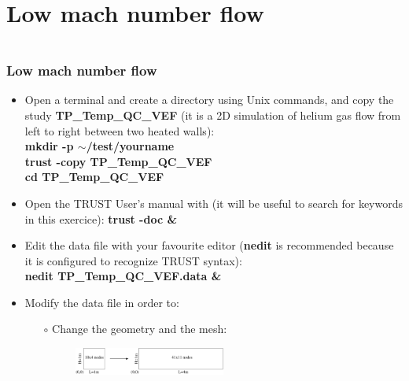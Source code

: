\documentclass[10pt]{beamer}
\begin{document}
\section{Low mach number flow}
\begin{frame}
\begin{columns}[c] 
\tableofcontents[sections={1-7},currentsection, currentsubsection]
\tableofcontents[sections={8-13},currentsection, currentsubsection]
\end{columns}
\end{frame}
\begin{frame}
\frametitle{Low mach number flow}
\begin{block}{}

\begin{itemize}
\item Open a terminal and create a directory using Unix commands, and copy the study \textbf{TP\_Temp\_QC\_VEF} (it is a 2D simulation of helium gas flow from left to right between two heated walls):\\
\textbf{mkdir -p $\sim$/test/yourname}\\
\textbf{trust -copy TP\_Temp\_QC\_VEF}\\
\textbf{cd TP\_Temp\_QC\_VEF}

\item Open the TRUST User's manual with (it will be useful to search for keywords in this exercice): \textbf{trust -doc \&}

\item Edit the data file with your favourite editor (\textbf{nedit} is recommended because it is configured to recognize TRUST syntax):\\
\textbf{nedit TP\_Temp\_QC\_VEF.data \&}

\item Modify the data file in order to:
    \begin{itemize}
    \item [$\circ$] Change the geometry and the mesh:
    \begin{figure}
    \includegraphics[width=0.5\textwidth]{PICTURES/low_mach.pdf}
    \end{figure}
    \end{itemize}
\end{itemize}

\end{block}
\end{frame}
\end{document}
